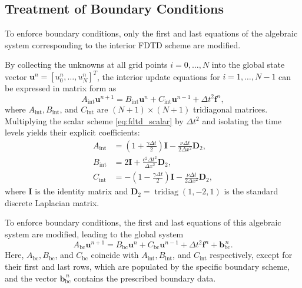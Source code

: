 \documentclass{Configuration_Files/PoliMi3i_thesis}
\begin{document}
\subsection{Treatment of Boundary Conditions}

To enforce boundary conditions, only the first and last equations of the algebraic system corresponding to the interior FDTD scheme are modified.

By collecting the unknowns at all grid points $i=0,\dots,N$ into the global state vector $\mathbf{u}^n = [u_0^n, \dots, u_N^n]^T$, the interior update equations for $i=1,\dots,N-1$ can be expressed in matrix form as
\begin{equation}
A_{\mathrm{int}}\mathbf{u}^{n+1}
=
B_{\mathrm{int}}\mathbf{u}^{n}
+
C_{\mathrm{int}}\mathbf{u}^{n-1}
+
\Delta t^2\mathbf{f}^{n},
\label{eq:fdtd_interior_system}
\end{equation}
where $A_{\mathrm{int}}, B_{\mathrm{int}}$, and $C_{\mathrm{int}}$ are $(N+1)\times(N+1)$ tridiagonal matrices. Multiplying the scalar scheme \eqref{eq:fdtd_scalar} by $\Delta t^2$ and isolating the time levels yields their explicit coefficients:
\begin{align*}
A_{\mathrm{int}}
&=
\left(1+\frac{\gamma\Delta t}{2}\right)\mathbf{I}
-
\frac{\nu\Delta t}{2\Delta x^2} \mathbf{D}_2,
\\
B_{\mathrm{int}}
&=
2\mathbf{I}
+
\frac{c^2\Delta t^2}{\Delta x^2} \mathbf{D}_2,
\\
C_{\mathrm{int}}
&=
-\left(1-\frac{\gamma\Delta t}{2}\right)\mathbf{I}
-
\frac{\nu\Delta t}{2\Delta x^2} \mathbf{D}_2,
\end{align*}
where $\mathbf{I}$ is the identity matrix and $\mathbf{D}_2 = \operatorname{tridiag}(1, -2, 1)$ is the standard discrete Laplacian matrix.

To enforce boundary conditions, the first and last equations of this algebraic system are modified, leading to the global system
\begin{equation}
A_{\mathrm{bc}}\mathbf{u}^{n+1}
=
B_{\mathrm{bc}}\mathbf{u}^{n}
+
C_{\mathrm{bc}}\mathbf{u}^{n-1}
+
\Delta t^2\mathbf{f}^{n}
+
\mathbf{b}_{\mathrm{bc}}^{\,n}.
\label{eq:fdtd_global_system}
\end{equation}
Here, $A_{\mathrm{bc}}, B_{\mathrm{bc}}$, and $C_{\mathrm{bc}}$ coincide with $A_{\mathrm{int}}, B_{\mathrm{int}}$, and $C_{\mathrm{int}}$ respectively, except for their first and last rows, which are populated by the specific boundary scheme, and the vector $\mathbf{b}_{\mathrm{bc}}^{\,n}$ contains the prescribed boundary data.
\end{document}

